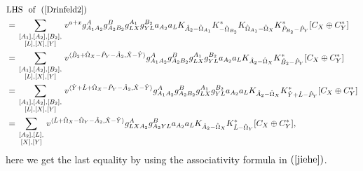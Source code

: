 \documentclass[reqno,12pt]{amsart}
\numberwithin{equation}{section}
\def\lr#1{\langle #1\rangle} \def\fin{\hfill$\square$}  \def\lra{\longrightarrow} \def\Tor{\mbox{\rm Tor}\,}
\theoremstyle{plain} %
\theoremstyle{definition} %
\begin{document}
\begin{equation*}\begin{split}
&\mbox{LHS~~of}~~(\ref{Drinfeld2})\\&=\sum_{\begin{smallmatrix}[A_1],[A_2],[B_2],\\ [L],[X],[Y]\end{smallmatrix}}v^{a+x}
g_{A_1A_2}^Ag_{A_2B_2}^Bg_{LX}^{A_1}g_{YL}^{B_2}
a_{A_2}a_LK_{\hat{A}_2-\hat{\Omega}_{A_1}}K_{-\hat{\Omega}_{B_2}}^\ast K_{\hat{\Omega}_{A_1}-\hat{\Omega}_X}K_{\hat{P}_{B_2}-\hat{P}_Y}^\ast[C_X\oplus C_Y^\ast]\\
&=\sum_{\begin{smallmatrix}[A_1],[A_2],[B_2],\\ [L],[X],[Y]\end{smallmatrix}}v^{\lr{\hat{B}_2+\hat{\Omega}_X-\hat{P}_Y-\hat{A}_2,\hat{X}-\hat{Y}}}
g_{A_1A_2}^Ag_{A_2B_2}^Bg_{LX}^{A_1}g_{YL}^{B_2}
a_{A_2}a_LK_{\hat{A}_2-\hat{\Omega}_X}K_{\hat{B}_2-\hat{P}_Y}^\ast[C_X\oplus C_Y^\ast]\\
&=\sum_{\begin{smallmatrix}[A_1],[A_2],[B_2],\\ [L],[X],[Y]\end{smallmatrix}}v^{\lr{\hat{Y}+\hat{L}+\hat{\Omega}_X-\hat{P}_Y-\hat{A}_2,\hat{X}-\hat{Y}}}
g_{A_1A_2}^Ag_{A_2B_2}^Bg_{LX}^{A_1}g_{YL}^{B_2}
a_{A_2}a_LK_{\hat{A}_2-\hat{\Omega}_X}K_{\hat{Y}+\hat{L}-\hat{P}_Y}^\ast[C_X\oplus C_Y^\ast]\\
&=\sum_{\begin{smallmatrix}[A_2],[L],\\ [X],[Y]\end{smallmatrix}}v^{\lr{\hat{L}+\hat{\Omega}_X-\hat{\Omega}_Y-\hat{A}_2,\hat{X}-\hat{Y}}}
g_{LXA_2}^Ag_{A_2YL}^B
a_{A_2}a_LK_{\hat{A}_2-\hat{\Omega}_X}K_{\hat{L}-\hat{\Omega}_Y}^\ast[C_X\oplus C_Y^\ast],
\end{split}\end{equation*}here we get the last equality by using the associativity formula in $(\ref{jiehe})$.
\end{document}
